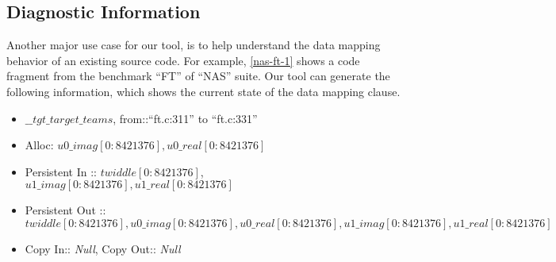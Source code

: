 \subsection{Diagnostic Information}
\label{diagnostic}
Another major use case for our tool, is to help understand 
the data mapping behavior of an existing source code. 
For example, \autoref{nas-ft-1} shows a code fragment 
from the benchmark ``FT'' of ``NAS'' suite.
Our tool can generate the following information, which 
shows the current state of the data mapping clause.
\begin{itemize}
    \vspace{-4pt}
 \item \texttt{$\_\_tgt\_target\_teams$}, from::``ft.c:311'' to ``ft.c:331''
 \item Alloc: $u0\_imag[0:8421376],u0\_real[0:8421376]$
 \item Persistent In :: $twiddle[0:8421376]$, 
 $u1\_imag[0:8421376],u1\_real[0:8421376]$
 \item  Persistent Out ::  $twiddle[0:8421376],u0\_imag[0:8421376],u0\_real[0:8421376],u1\_imag[0:8421376],u1\_real[0:8421376]$
 \item Copy In:: \textit{Null}, Copy Out:: \textit{Null} 
\end{itemize}

